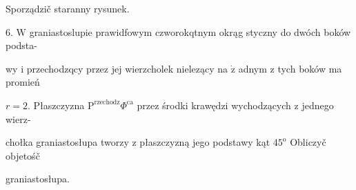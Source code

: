 \documentclass[a4paper,12pt]{article}
\begin{document}
Sporządzič staranny rysunek.

6. $\mathrm{W}$ graniastoslupie prawidfowym czworokqtnym okrąg styczny do dwóch boków podsta-

wy $\mathrm{i}$ przechodzqcy przez jej wierzcholek nielezący na $\dot{\mathrm{z}}$ adnym $\mathrm{z}$ tych boków ma promień

$r=2$. Płaszczyzna $\mathrm{P}^{\mathrm{r}\mathrm{z}\mathrm{e}\mathrm{c}\mathrm{h}\mathrm{o}\mathrm{d}\mathrm{z}}\Phi^{\mathrm{c}\mathrm{a}}$ przez środki krawędzi wychodzących $\mathrm{z}$ jednego wierz-

chołka graniastosłupa tworzy $\mathrm{z}$ płaszczyzną jego podstawy kąt $45^{\mathrm{o}}$ Obliczyč objetośč

graniastosłupa.
\end{document}

